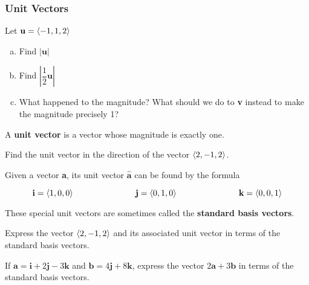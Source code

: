 \documentclass[notes]{subfiles}
\begin{document}
	\subsubsection*{Unit Vectors}
		\begin{ex}
			Let $\textbf{u} =\left\langle -1,1,2\right\rangle$
			\begin{enumerate}[(a)]
				\item Find $|\textbf{u}|$
					
				\item Find $\left|\dfrac{1}{2}\textbf{u}\right|$
				
				\item What happened to the magnitude?  What should we do to \textbf{v} instead to make the magnitude precisely 1?
			\end{enumerate}
		\end{ex}
			\newpage
			
		\begin{defn}
			A \textbf{unit vector} is a vector whose magnitude is exactly one.
		\end{defn}
		
		\begin{ex}
			Find the unit vector in the direction of the vector $\left\langle 2,-1,2\right\rangle$.
		\end{ex}
			\vs{1}
		\begin{rmk}
			Given a vector \textbf{a}, its unit vector $\hat{\mathbf{a}}$ can be found by the formula \blank{2}
		\end{rmk}
		\begin{rmk}
			\[\textbf{i} = \left\langle 1,0,0\right\rangle\hspace{1in}
			\textbf{j} = \left\langle 0,1,0\right\rangle \hspace{1in}
			\textbf{k} = \left\langle 0,0,1\right\rangle\]

			These special unit vectors are sometimes called the \textbf{standard basis vectors}.
		\end{rmk}
		
		\begin{ex}
			Express the vector $\left\langle 2,-1,2\right\rangle$ and its associated unit vector in terms of the standard basis vectors.
		\end{ex}
			\vs{1}
			
		\begin{ex}
			If $\textbf{a} = \textbf{i} +2\textbf{j} - 3\textbf{k}$ and $\textbf{b} = 4\textbf{j} + 8\textbf{k}$, express the vector $2\textbf{a} + 3\textbf{b}$ in terms of the standard basis vectors.
		\end{ex}
			\vs{1}
			\newpage
		
\end{document}
